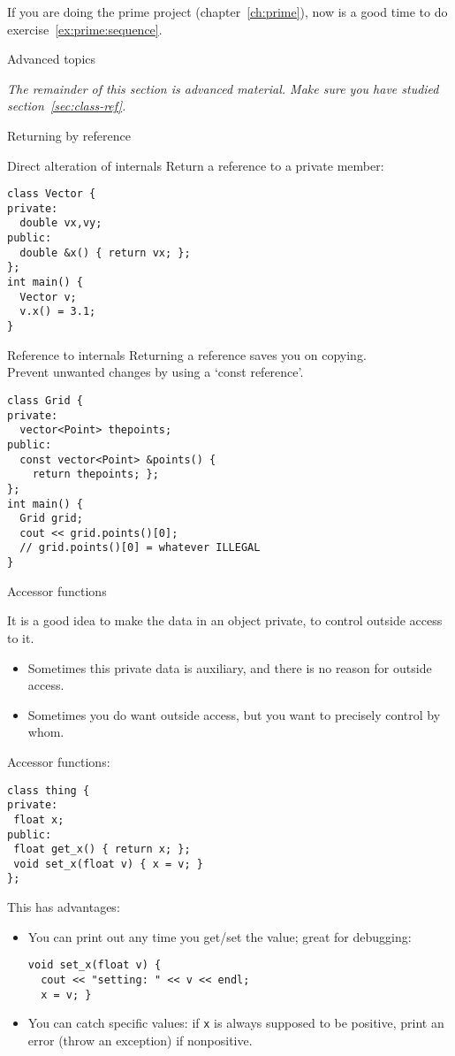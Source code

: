 \begin{exercise}
  If you are doing the prime project (chapter~\ref{ch:prime}),
  now is a good time to do exercise~\ref{ex:prime:sequence}.
\end{exercise}



 {Advanced topics}

\emph{The remainder of this section is advanced material. Make sure
  you have studied section~\ref{sec:class-ref}.}

 {Returning by reference}

\begin{block}{Direct alteration of internals}
  \label{sl:obj-return-ref}
  Return a reference to a private member:
\begin{lstlisting}
class Vector {
private:
  double vx,vy;
public:
  double &x() { return vx; };
};
int main() {
  Vector v;
  v.x() = 3.1;
}
\end{lstlisting}
\end{block}

\begin{block}{Reference to internals}
  \label{sl:obj-return-const-ref}
  Returning a reference saves you on copying.\\
  Prevent unwanted changes by using a `const reference'.
\begin{lstlisting}
class Grid {
private:
  vector<Point> thepoints;
public:
  const vector<Point> &points() {
    return thepoints; };
};
int main() {
  Grid grid;
  cout << grid.points()[0];
  // grid.points()[0] = whatever ILLEGAL
}
\end{lstlisting}
\end{block}

 {Accessor functions}

It is a good idea to make the data in an object private,
to control outside access to it.
\begin{itemize}
\item Sometimes this private data is auxiliary, and there is no reason
  for outside access.
\item Sometimes you do want outside access, but you want to precisely
  control by whom.
\end{itemize}

Accessor functions:
\begin{lstlisting}
class thing {
private:
 float x;
public:
 float get_x() { return x; };
 void set_x(float v) { x = v; }
};
\end{lstlisting}
This has advantages:
\begin{itemize}
\item You can print out any time you get/set the value; great for
  debugging:
\begin{lstlisting}
void set_x(float v) {
  cout << "setting: " << v << endl;
  x = v; }
\end{lstlisting}
\item You can catch specific values: if \lstinline{x} is always supposed to be
  positive, print an error (throw an exception) if nonpositive.
\end{itemize}

